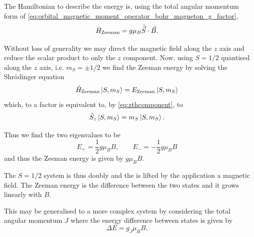 The Hamiltonian to describe the energy is, using the total angular momentum form of \eqref{eq:orbital_magnetic_moment_operator_bohr_magneton_g_factor}, 
\begin{equation}
    \hat{H}_{\ce{Zeeman}} = g \mu_B \hat{\vec{S}}\cdot\vec{B}. 
    \label{eq:Zeeman_Hamiltonian}
\end{equation}

Without loss of generality we may direct the magnetic field along the $z$ axis and reduce the scalar product to only the $z$ component. Now, using $S=1/2$ quantised along the $z$ axis, i.e. $m_S = \pm 1/2$ we find the Zeeman energy by solving the Shr\"odinger equation 
\begin{equation}
    \hat{H}_{\ce{Zeeman}} \ket{S, m_S} = E_{\ce{Zeeman}}\ket{S, m_S} 
\end{equation}
which, to a factor is equivalent to, by \eqref{eq:zthcomponent}, to
\begin{equation}
    \hat{S}_{z} \ket{S, m_S} = m_S\ket{S, m_S}.
\end{equation}

Thus we find the two eigenvalues to be
\begin{equation}
E_+ =\frac{1}{2}g\mu_BB, \qquad E_-=-\frac{1}{2}g\mu_BB
    \label{eq:}
\end{equation}
and thus the Zeeman energy is given by $g\mu_B B$. 



The $S=1/2$ system is thus doubly  and the  is lifted by the application a magnetic field. The Zeeman energy is the difference between the two states and it grows linearly with $B$. 

This may be generalised to a more complex system by considering the total angular momentum $J$ where the energy difference between states is given by 
\begin{equation}
   \Delta E = g_J \mu_B B. 
    \label{eq:zeeman_energy}
\end{equation}





